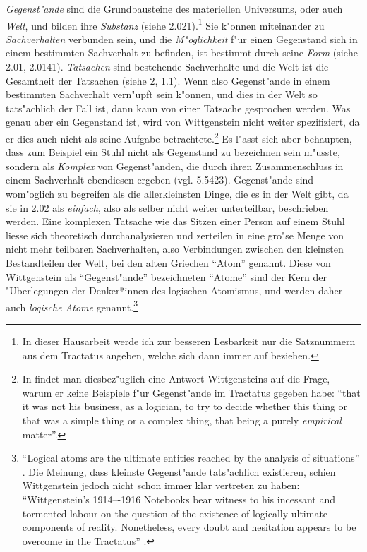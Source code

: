 \documentclass[a4paper, emulatestandardclasses, 12pt]{scrartcl}
\begin{document}
\begin{onehalfspace}
\emph{Gegenst"ande} sind die Grundbausteine des materiellen Universums, oder auch \emph{Welt}, und bilden ihre \emph{Substanz} (siehe 2.021).\footnote{In dieser Hausarbeit werde ich zur besseren Lesbarkeit nur die Satznummern aus dem Tractatus angeben, welche sich dann immer auf \cite{wittgenstein1963tractatus} beziehen.} Sie k"onnen miteinander zu \emph{Sachverhalten} verbunden sein, und die \emph{M"oglichkeit} f"ur einen Gegenstand sich in einem bestimmten Sachverhalt zu befinden, ist bestimmt durch seine \emph{Form} (siehe 2.01, 2.0141). \emph{Tatsachen} sind bestehende Sachverhalte und die Welt ist die Gesamtheit der Tatsachen (siehe 2, 1.1). Wenn also Gegenst"ande in einem bestimmten Sachverhalt vern"upft sein k"onnen, und dies in der Welt so tats"achlich der Fall ist, dann kann von einer Tatsache gesprochen werden. Was genau aber ein Gegenstand ist, wird von Wittgenstein nicht weiter spezifiziert, da er dies auch nicht als seine Aufgabe betrachtete.\footnote{In \cite[S. 70]{malcolm2001ludwig} findet man diesbez"uglich eine Antwort Wittgensteins auf die Frage, warum er keine Beispiele f"ur Gegenst"ande im Tractatus gegeben habe: "`that it was not his business, as a logician, to try to decide whether this thing or that was a simple thing or a complex thing, that being a purely \emph{empirical} matter"'.} Es l"asst sich aber behaupten, dass zum Beispiel ein Stuhl nicht als Gegenstand zu bezeichnen sein m"usste, sondern als \emph{Komplex} von Gegenst"anden, die durch ihren Zusammenschluss in einem Sachverhalt ebendiesen ergeben (vgl. 5.5423). Gegenst"ande sind wom"oglich zu begreifen als die allerkleinsten Dinge, die es in der Welt gibt, da sie in 2.02 als \emph{einfach}, also als selber nicht weiter unterteilbar, beschrieben werden. Eine komplexen Tatsache wie das Sitzen einer Person auf einem Stuhl liesse sich theoretisch durchanalysieren und zerteilen in eine gro"se Menge von nicht mehr teilbaren Sachverhalten, also Verbindungen zwischen den kleinsten Bestandteilen der Welt, bei den alten Griechen "`Atom"' genannt. Diese von Wittgenstein als "`Gegenst"ande"' bezeichneten "`Atome"' sind der Kern der "Uberlegungen der Denker*innen des logischen Atomismus, und werden daher auch \emph{logische Atome} genannt.\footnote{"`Logical atoms are the ultimate entities reached by the analysis of situations"' \cite[S. 47]{frascolla2007understanding}. Die Meinung, dass kleinste Gegenst"ande tats"achlich existieren, schien Wittgenstein jedoch nicht schon immer klar vertreten zu haben: "`Wittgenstein's 1914–-1916 Notebooks bear witness to his incessant and tormented labour on the question of the existence of logically ultimate components of reality. Nonetheless, every doubt and hesitation appears to be overcome in the Tractatus"' \cite[S. 48]{frascolla2007understanding}.} %


\end{onehalfspace}
\end{document}
